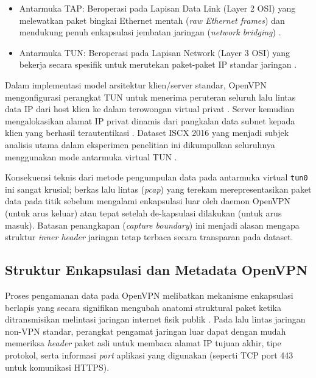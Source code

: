\begin{itemize}
    \item Antarmuka TAP: Beroperasi pada Lapisan Data Link (Layer 2 OSI) yang melewatkan paket bingkai Ethernet mentah (\textit{raw Ethernet frames}) dan mendukung penuh enkapsulasi jembatan jaringan (\textit{network bridging}) \citep{crist2015mastering}.
    \item Antarmuka TUN: Beroperasi pada Lapisan Network (Layer 3 OSI) yang bekerja secara spesifik untuk merutekan paket-paket IP standar jaringan \citep{crist2015mastering}.
\end{itemize}

Dalam implementasi model arsitektur klien/server standar, OpenVPN mengonfigurasi perangkat TUN untuk menerima peruteran seluruh lalu lintas data IP dari host klien ke dalam terowongan virtual privat \citep{crist2015mastering}. Server kemudian mengalokasikan alamat IP privat dinamis dari pangkalan data subnet kepada klien yang berhasil terautentikasi \citep{crist2015mastering}. Dataset ISCX 2016 yang menjadi subjek analisis utama dalam eksperimen penelitian ini dikumpulkan seluruhnya menggunakan mode antarmuka virtual TUN \citep{DraperGil2016}. 

Konsekuensi teknis dari metode pengumpulan data pada antarmuka virtual \texttt{tun0} ini sangat krusial; berkas lalu lintas (\textit{pcap}) yang terekam merepresentasikan paket data pada titik sebelum mengalami enkapsulasi luar oleh daemon OpenVPN (untuk arus keluar) atau tepat setelah de-kapsulasi dilakukan (untuk arus masuk). Batasan penangkapan (\textit{capture boundary}) ini menjadi alasan mengapa struktur \textit{inner header} jaringan tetap terbaca secara transparan pada dataset.

\subsection{Struktur Enkapsulasi dan Metadata OpenVPN}
\label{subsec:bab2-enkapsulasi}

Proses pengamanan data pada OpenVPN melibatkan mekanisme enkapsulasi berlapis yang secara signifikan mengubah anatomi struktural paket ketika ditransmisikan melintasi jaringan internet fisik publik \citep{crist2015mastering}. Pada lalu lintas jaringan non-VPN standar, perangkat pengamat jaringan luar dapat dengan mudah memeriksa \textit{header} paket asli untuk membaca alamat IP tujuan akhir, tipe protokol, serta informasi \textit{port} aplikasi yang digunakan (seperti TCP port 443 untuk komunikasi HTTPS). 

